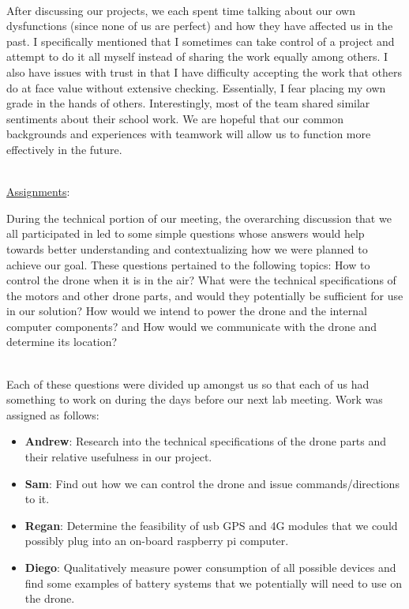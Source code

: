 \documentclass[12pt]{extarticle}
\newenvironment{myindentpar}[1]%
 {\begin{list}{}%
         {\setlength{\leftmargin}{#1}}%
         \item[]%
 }
 {\end{list}}
\begin{document}
\begin{myindentpar}{6.5mm}
    \ \\
    After discussing our projects, we each spent time talking about our own dysfunctions (since none of us are perfect) and how they have affected us in the past.  I specifically mentioned that I sometimes can take control of a project and attempt to do it all myself instead of sharing the work equally among others.  I also have issues with trust in that I have difficulty accepting the work that others do at face value without extensive checking.  Essentially, I fear placing my own grade in the hands of others.  Interestingly, most of the team shared similar sentiments about their school work.  We are hopeful that our common backgrounds and experiences with teamwork will allow us to function more effectively in the future.  

\end{myindentpar}

\vspace{-3mm}
\ \\
\underline{Assignments}:

\begin{myindentpar}{6.5mm}

    \noindent
    During the technical portion of our meeting, the overarching discussion that we all participated in led to some simple questions whose answers would help towards better understanding and contextualizing how we were planned to achieve our goal.  These questions pertained to the following topics: How to control the drone when it is in the air? What were the technical specifications of the motors and other drone parts, and would they potentially be sufficient for use in our solution? How would we intend to power the drone and the internal computer components? and How would we communicate with the drone and determine its location?
    
    \ \\
    Each of these questions were divided up amongst us so that each of us had something to work on during the days before our next lab meeting.  Work was assigned as follows:
    
    \begin{itemize}
        \setlength\itemsep{-0.1em}
    
        \item \textbf{Andrew}: Research into the technical specifications of the drone parts and their relative usefulness in our project.   
        \item \textbf{Sam}: Find out how we can control the drone and issue commands/directions to it.  
        \item \textbf{Regan}: Determine the feasibility of usb GPS and 4G modules that we could possibly plug into an on-board raspberry pi computer.  
        \item \textbf{Diego}: Qualitatively measure power consumption of all possible devices and find some examples of battery systems that we potentially will need to use on the drone.  
        
    \end{itemize}
    
\end{myindentpar}
\vspace{-5mm}
\end{document}
